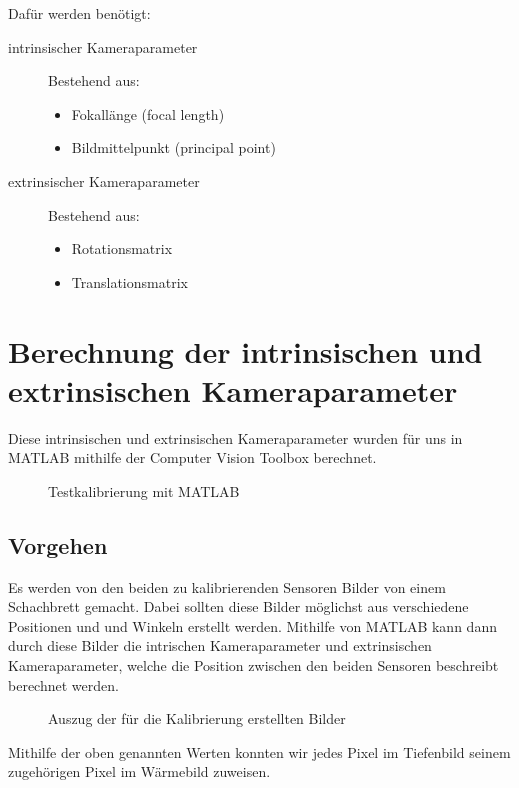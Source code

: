 Dafür werden benötigt:
\begin{description}
	\item[intrinsischer Kameraparameter] Bestehend aus:
	\begin{itemize}
		\item Fokallänge (focal length) 
		\item Bildmittelpunkt (principal point)
	\end{itemize}
	\item[extrinsischer Kameraparameter] Bestehend aus:
	\begin{itemize}
		\item Rotationsmatrix
		\item Translationsmatrix
	\end{itemize}
\end{description}

\section{Berechnung der intrinsischen und extrinsischen Kameraparameter}
Diese intrinsischen und extrinsischen Kameraparameter wurden für uns in MATLAB mithilfe der Computer Vision Toolbox berechnet.
\begin{figure}[h]
	\centering
	\caption{Testkalibrierung mit MATLAB}
	\label{fig:calib_matlab}
\end{figure}

\subsection{Vorgehen}
Es werden von den beiden zu kalibrierenden Sensoren Bilder von einem Schachbrett gemacht.
Dabei sollten diese Bilder möglichst aus verschiedene Positionen und und Winkeln erstellt werden.
Mithilfe von MATLAB kann dann durch diese Bilder die intrischen Kameraparameter und extrinsischen Kameraparameter, welche die Position zwischen den beiden Sensoren beschreibt berechnet werden.
\begin{figure}[h]
	\centering
	\caption{Auszug der für die Kalibrierung erstellten Bilder}
	\label{fig:calib_pics}
\end{figure}
Mithilfe der oben genannten Werten konnten wir jedes Pixel im Tiefenbild seinem zugehörigen Pixel im Wärmebild zuweisen.

